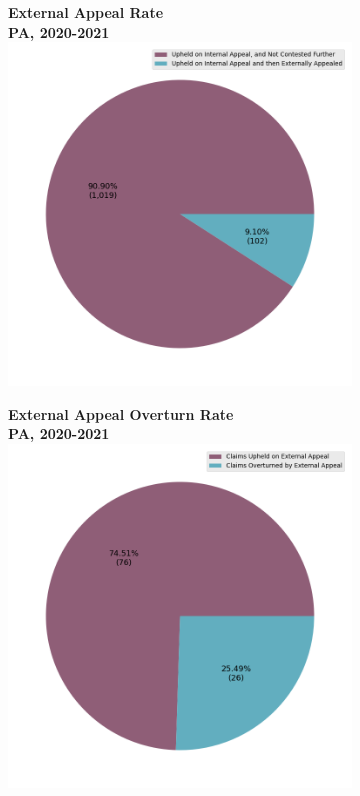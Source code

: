 \documentclass[12pt, a4paper,twoside,parskip=full]{report}
\theoremstyle{plain} %
\theoremstyle{definition} %
\theoremstyle{remark} %
\numberwithin{equation}{chapter}
\begin{document}
		\begin{figure}[h!]
			\centering
			\begin{subfigure}[b]{0.49\textwidth}
				\centering
				\textbf{External Appeal Rate}\\
				\textbf{PA, 2020-2021}\\
				\includegraphics[width=\textwidth]{images/pa_claims/overall_external_appeal_rate_pie.png}
			\end{subfigure}
			\hfill
			\begin{subfigure}[b]{0.49\textwidth}
				\centering
				\textbf{External Appeal Overturn Rate}\\
				\textbf{PA, 2020-2021}\\
				\includegraphics[width=\textwidth]{images/pa_claims/external_appeal_success_rates.png}

\end{subfigure}
\end{figure}
\end{document}
